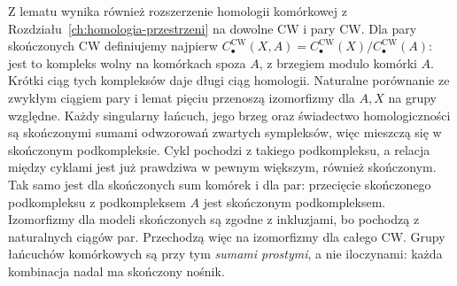 Z lematu wynika również rozszerzenie homologii komórkowej
z Rozdziału~\ref{ch:homologia-przestrzeni} na dowolne CW i pary CW.
Dla pary skończonych CW definiujemy najpierw
$C_\bullet^{\mathrm{CW}}(X,A)=C_\bullet^{\mathrm{CW}}(X)/C_\bullet^{\mathrm{CW}}(A)$:
jest to kompleks wolny na komórkach spoza $A$, z brzegiem modulo komórki $A$.
Krótki ciąg tych kompleksów daje długi ciąg homologii.
Naturalne porównanie ze zwykłym ciągiem pary i lemat pięciu
przenoszą izomorfizmy dla $A,X$ na grupy względne.
Każdy singularny łańcuch, jego brzeg oraz świadectwo homologiczności
są skończonymi sumami odwzorowań zwartych sympleksów, więc mieszczą się
w skończonym podkompleksie. Cykl pochodzi z takiego podkompleksu,
a relacja między cyklami jest już prawdziwa w pewnym większym,
również skończonym. Tak samo jest dla skończonych sum komórek
i dla par: przecięcie skończonego podkompleksu z podkompleksem $A$
jest skończonym podkompleksem. Izomorfizmy dla modeli skończonych
są zgodne z inkluzjami, bo pochodzą z naturalnych ciągów par.
Przechodzą więc na izomorfizmy dla całego CW.
Grupy łańcuchów komórkowych są przy tym \emph{sumami prostymi},
a nie iloczynami: każda kombinacja nadal ma skończony nośnik.

